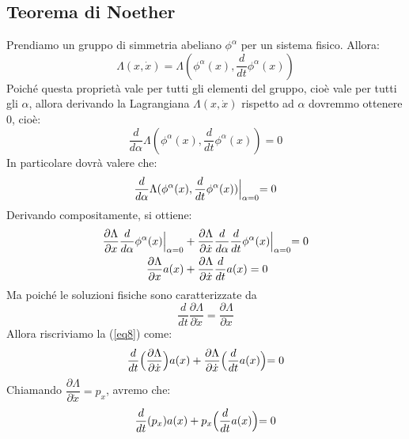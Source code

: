 \documentclass[a4paper,openany]{article}
\begin{document}
	\subsection{Teorema di Noether}
	Prendiamo un gruppo di simmetria abeliano $\phi^{\alpha}$ per un sistema fisico. Allora:
	\begin{equation}\label{key}
		\Lambda(x,\dot{x}) = \Lambda(\phi^{\alpha}(x), \dfrac{d}{dt}\phi^{\alpha}(x))
	\end{equation}
	Poiché questa proprietà vale per tutti gli elementi del gruppo, cioè vale per tutti gli $\alpha$, allora derivando la Lagrangiana $\Lambda(x,\dot{x})$ rispetto ad $\alpha$ dovremmo ottenere $0$, cioè:
	\begin{equation}\label{key}
		\dfrac{d}{d\alpha}\Lambda(\phi^{\alpha}(x), \dfrac{d}{dt}\phi^{\alpha}(x)) = 0
	\end{equation}
	In particolare dovrà valere che:
	\begin{equation}\label{key}
		\dfrac{d}{d\alpha}\Lambda(\phi^{\alpha}(x), \dfrac{d}{dt}\phi^{\alpha}(x))\Bigl|_{\alpha = 0} = 0
	\end{equation}
	Derivando compositamente, si ottiene:
	\begin{equation}\label{eq8}
		\begin{aligned}
			\dfrac{\partial \Lambda}{\partial x}\dfrac{d}{d\alpha}\phi^{\alpha}(x)\Bigl|_{\alpha = 0} &+ \dfrac{\partial \Lambda}{\partial \dot{x}}\dfrac{d}{d\alpha}\dfrac{d}{dt}\phi^{\alpha}(x)\Bigl|_{\alpha = 0} =0 \\
			\dfrac{\partial \Lambda}{\partial x} a(x) &+ \dfrac{\partial \Lambda}{\partial \dot{x}} \dfrac{d}{dt}a(x) = 0
		\end{aligned}
	\end{equation}
	Ma poiché le soluzioni fisiche sono caratterizzate da
	\begin{equation}\label{key}
		\dfrac{d}{dt}\dfrac{\partial \Lambda}{\partial \dot{x}} = \dfrac{\partial \Lambda}{\partial x}
	\end{equation}
	Allora riscriviamo la (\ref{eq8}) come:
	\begin{equation}\label{key}
		\dfrac{d}{dt}\Bigl(\dfrac{\partial \Lambda}{\partial \dot{x}}\Bigl)a(x) + \dfrac{\partial \Lambda}{\partial \dot{x}}\Bigl( \dfrac{d}{dt}a(x)\Bigl) = 0
	\end{equation}
	Chiamando $\dfrac{\partial \Lambda}{\partial \dot{x}} = p_{x}$, avremo che:
	\begin{equation}\label{key}
		\dfrac{d}{dt}(p_x)a(x) + p_x\Bigl( \dfrac{d}{dt}a(x)\Bigl) = 0
	\end{equation}
\end{document}
